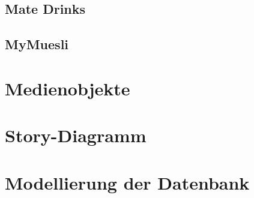 \documentclass[12pt,a4paper,oneside,ngerman]{article}
\begin{document}
\subsection{Mate Drinks}

\subsection{MyMuesli}


\section{Medienobjekte}


\section{Story-Diagramm}



\section{Modellierung der Datenbank}
\end{document}
